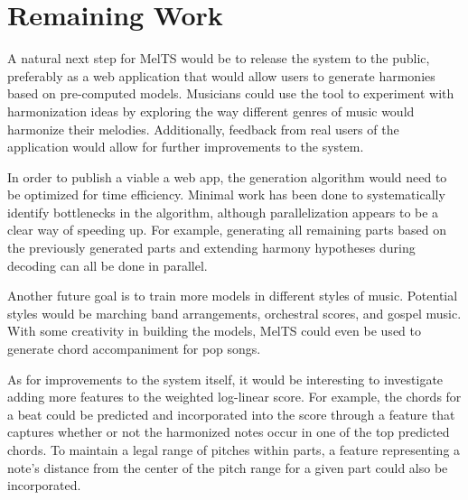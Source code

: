 \documentclass{sig-alternate}
\begin{document}
\section{Remaining Work}
A natural next step for MelTS would be to release the system to the public, preferably as a web application that would allow users to generate harmonies based on pre-computed models. Musicians could use the tool to experiment with harmonization ideas by exploring the way different genres of music would harmonize their melodies. Additionally, feedback from real users of the application would allow for further improvements to the system. 

In order to publish a viable a web app, the generation algorithm would need to be optimized for time efficiency. Minimal work has been done to systematically identify bottlenecks in the algorithm, although parallelization appears to be a clear way of speeding up. For example, generating all remaining parts based on the previously generated parts and extending harmony hypotheses during decoding can all be done in parallel.

Another future goal is to train more models in different styles of music. Potential styles would be marching band arrangements, orchestral scores, and gospel music. With some creativity in building the models, MelTS could even be used to generate chord accompaniment for pop songs.

As for improvements to the system itself, it would be interesting to investigate adding more features to the weighted log-linear score. For example, the chords for a beat could be predicted and incorporated into the score through a feature that captures whether or not the harmonized notes occur in one of the top predicted chords. To maintain a legal range of pitches within parts, a feature representing a note's distance from the center of the pitch range for a given part could also be incorporated.
\label{sec:remaining_work}



\label{app}
\end{document}
